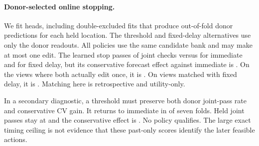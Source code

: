 \paragraph{Donor-selected online stopping.}
We fit \StopFits{} heads, including double-excluded fits that produce
out-of-fold donor predictions for each held location. The threshold and
fixed-delay alternatives use only the donor readouts. All policies use
the same candidate bank and may make at most one edit. The learned stop
passes \StopLearned{} of \StopViews{} joint checks versus
\StopImmediate{} for immediate and \StopFixed{} for fixed delay, but
its conservative forecast effect against immediate is \StopFull{}.
On the \StopMatched{} views where both actually edit once, it is
\StopEffect{}. On \StopFixedMatched{} views matched with fixed delay,
it is \StopFixedEffect{}. Matching here is retrospective and utility-only.

In a secondary diagnostic, a threshold must preserve both donor
joint-pass rate and conservative CV gain. It returns to immediate
in \StopFallback{} of seven folds. Held joint passes stay at
\StopImmediate{} and the conservative effect is \StopGuard{}.
No policy qualifies. The large exact timing ceiling is not evidence
that these past-only scores identify the later feasible actions.
